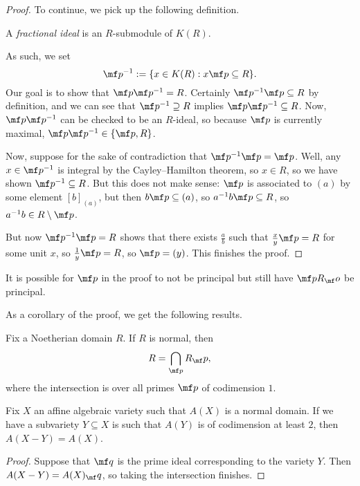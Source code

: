 \documentclass[../notes.tex]{subfiles}
\begin{document}
\begin{proof}
	To continue, we pick up the following definition.
	\begin{definition}
		A \textit{fractional ideal} is an $R$-submodule of $K(R)$.
	\end{definition}
	As such, we set
	\[\mf p^{-1}:=\{x\in K(R):x\mf p\subseteq R\}.\]
	Our goal is to show that $\mf p\mf p^{-1}=R$. Certainly $\mf p^{-1}\mf p\subseteq R$ by definition, and we can see that $\mf p^{-1}\supseteq R$ implies $\mf p\mf p^{-1}\subseteq R$. Now, $\mf p\mf p^{-1}$ can be checked to be an $R$-ideal, so because $\mf p$ is currently maximal, $\mf p\mf p^{-1}\in\{\mf p,R\}$.

	Now, suppose for the sake of contradiction that $\mf p^{-1}\mf p=\mf p$. Well, any $x\in\mf p^{-1}$ is integral by the Cayley--Hamilton theorem, so $x\in R$, so we have shown $\mf p^{-1}\subseteq R$. But this does not make sense: $\mf p$ is associated to $(a)$ by some element $[b]_{(a)}$, but then $b\mf p\subseteq(a)$, so $a^{-1}b\mf p\subseteq R$, so $a^{-1}b\in R\setminus\mf p$.

	But now $\mf p^{-1}\mf p=R$ shows that there exists $\frac ab$ such that $\frac xy\mf p=R$ for some unit $x$, so $\frac1y\mf p=R$, so $\mf p=(y)$. This finishes the proof.
\end{proof}
\begin{remark}
	It is possible for $\mf p$ in the proof to not be principal but still have $\mf pR_\mf o$ be principal.
\end{remark}
As a corollary of the proof, we get the following results.
\begin{corollary}
	Fix a Noetherian domain $R$. If $R$ is normal, then
	\[R=\bigcap_{\mf p}R_\mf p,\]
	where the intersection is over all primes $\mf p$ of codimension $1$.
\end{corollary}
\begin{corollary}
	Fix $X$ an affine algebraic variety such that $A(X)$ is a normal domain. If we have a subvariety $Y\subseteq X$ is such that $A(Y)$ is of codimension at least $2$, then $A(X-Y)=A(X)$.
\end{corollary}
\begin{proof}
	Suppose that $\mf q$ is the prime ideal corresponding to the variety $Y$. Then $A(X-Y)=A(X)_\mf q$, so taking the intersection finishes. %
\end{proof}
\end{document}
